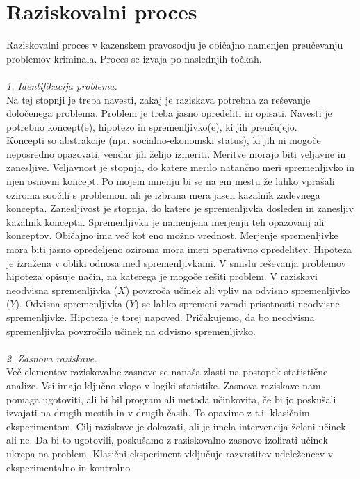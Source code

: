\documentclass[12pt,a4paper]{amsart}
\theoremstyle{definition} %
\theoremstyle{plain} %
\begin{document}
\section{Raziskovalni proces}
Raziskovalni proces v kazenskem pravosodju je običajno namenjen preučevanju problemov kriminala. Proces se izvaja po naslednjih točkah.\\\\
\textit{1. Identifikacija problema.\\} 
Na tej stopnji je treba navesti, zakaj je raziskava potrebna za reševanje določenega problema. Problem je treba jasno opredeliti in opisati. 
Navesti je potrebno koncept(e), hipotezo in spremenljivko(e), ki jih preučujejo.\\
Koncepti so abstrakcije (npr. socialno-ekonomski status), ki jih ni mogoče neposredno opazovati, vendar jih želijo izmeriti. Meritve morajo biti 
veljavne in zanesljive. Veljavnost je stopnja, do katere merilo natančno meri spremenljivko in njen osnovni koncept. Po mojem mnenju bi se na em mestu 
že lahko vprašali oziroma soočili s problemom ali je izbrana mera jasen kazalnik zadevnega koncepta. Zanesljivost je stopnja, do katere je 
spremenljivka dosleden in zanesljiv kazalnik koncepta. Spremenljivka je namenjena merjenju teh opazovanj ali konceptov. Običajno ima več kot 
eno možno vrednost. Merjenje spremenljivke mora biti jasno opredeljeno oziroma mora imeti operativno opredelitev. Hipoteza je izražena v 
obliki odnosa med spremenljivkami. V smislu reševanja problemov hipoteza opisuje način, na katerega je mogoče rešiti problem. V raziskavi 
neodvisna spremenljivka ($X$) povzroča učinek ali vpliv na odvisno spremenljivko ($Y$). Odvisna spremenljivka ($Y$) se lahko spremeni zaradi prisotnosti 
neodvisne spremenljivke. Hipoteza je torej napoved. Pričakujemo, da bo neodvisna spremenljivka povzročila učinek na odvisno spremenljivko.\\\\
\textit{2. Zasnova raziskave.\\} 
Več elementov raziskovalne zasnove se nanaša zlasti na postopek statistične analize. Vsi imajo ključno vlogo v logiki statistike. Zasnova raziskave 
nam pomaga ugotoviti, ali bi bil program ali metoda učinkovita, če bi jo poskušali izvajati na drugih mestih in v drugih časih. To opavimo 
z t.i. klasičnim eksperimentom. Cilj raziskave je dokazati, ali je imela intervencija želeni učinek ali ne. Da bi to ugotovili, poskušamo z 
raziskovalno zasnovo izolirati učinek ukrepa na problem. Klasični eksperiment vključuje razvrstitev udeležencev v eksperimentalno in kontrolno 
\end{document}
